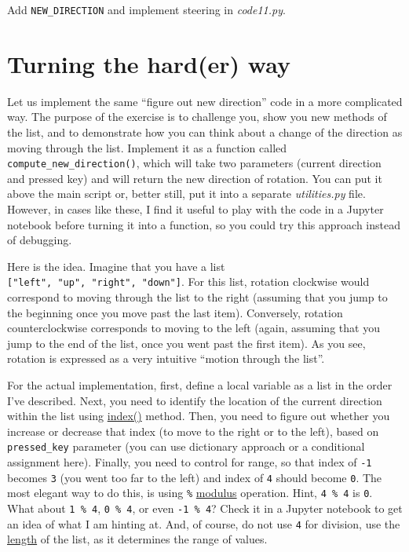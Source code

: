 \documentclass[
]{book}
\begin{document}
Add \texttt{NEW\_DIRECTION} and implement steering in \emph{code11.py}.

\hypertarget{turning-the-harder-way}{%
\section{Turning the hard(er) way}\label{turning-the-harder-way}}

Let us implement the same ``figure out new direction'' code in a more complicated way. The purpose of the exercise is to challenge you, show you new methods of the list, and to demonstrate how you can think about a change of the direction as moving through the list. Implement it as a function called \texttt{compute\_new\_direction()}, which will take two parameters (current direction and pressed key) and will return the new direction of rotation. You can put it above the main script or, better still, put it into a separate \emph{utilities.py} file. However, in cases like these, I find it useful to play with the code in a Jupyter notebook before turning it into a function, so you could try this approach instead of debugging.

Here is the idea. Imagine that you have a list \texttt{{[}"left",\ "up",\ "right",\ "down"{]}}. For this list, rotation clockwise would correspond to moving through the list to the right (assuming that you jump to the beginning once you move past the last item). Conversely, rotation counterclockwise corresponds to moving to the left (again, assuming that you jump to the end of the list, once you went past the first item). As you see, rotation is expressed as a very intuitive ``motion through the list''.

For the actual implementation, first, define a local variable as a list in the order I've described. Next, you need to identify the location of the current direction within the list using \href{https://docs.python.org/3/tutorial/datastructures.html\#more-on-lists}{index()} method. Then, you need to figure out whether you increase or decrease that index (to move to the right or to the left), based on \texttt{pressed\_key} parameter (you can use dictionary approach or a conditional assignment here). Finally, you need to control for range, so that index of \texttt{-1} becomes \texttt{3} (you went too far to the left) and index of \texttt{4} should become \texttt{0}. The most elegant way to do this, is using \texttt{\%} \href{https://python-reference.readthedocs.io/en/latest/docs/operators/modulus.html}{modulus} operation. Hint, \texttt{4\ \%\ 4} is \texttt{0}. What about \texttt{1\ \%\ 4}, \texttt{0\ \%\ 4}, or even \texttt{-1\ \%\ 4}? Check it in a Jupyter notebook to get an idea of what I am hinting at. And, of course, do not use \texttt{4} for division, use the \href{https://docs.python.org/3/library/functions.html\#len}{length} of the list, as it determines the range of values.
\end{document}
